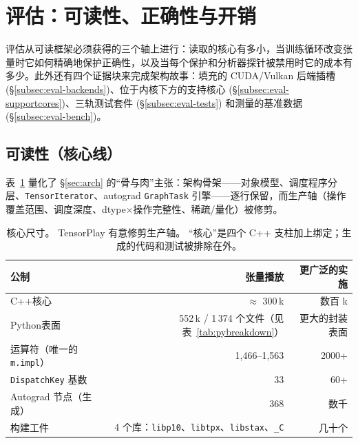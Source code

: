 \section{评估：可读性、正确性与开销}
\label{sec:eval}

评估从可读框架必须获得的三个轴上进行：读取的核心有多小，当训练循环改变张量时它如何精确地保护正确性，以及当每个保护和分析器探针被禁用时它的成本有多少。此外还有四个证据块来完成架构故事：填充的 CUDA/Vulkan 后端插槽 (\S\ref{subsec:eval-backends})、位于内核下方的支持核心 (\S\ref{subsec:eval-supportcores})、三轨测试套件 (\S\ref{subsec:eval-tests}) 和测量的基准数据 (\S\ref{subsec:eval-bench})。

\subsection{可读性（核心线）}
\label{subsec:eval-readability}

表~\ref{tab:evalsize} 量化了 \S\ref{sec:arch} 的“骨与肉”主张：架构骨架——对象模型、调度程序分层、\texttt{TensorIterator}、autograd \texttt{GraphTask} 引擎——逐行保留，而生产轴（操作覆盖范围、调度深度、dtype$\times$操作完整性、稀疏/量化）被修剪。

\begin{table}[H]
\centering
\caption{核心尺寸。 TensorPlay 有意修剪生产轴。 “核心”是四个 C++ 支柱加上绑定；生成的代码和测试被排除在外。}
\label{tab:evalsize}
\small
\begin{tabular}{lrr}
\toprule
公制 & 张量播放 & 更广泛的实施 \\
\midrule
C++核心 & $\approx$ 300\,k & 数百 k \\
Python表面 & 552\,k / 1\,374 个文件（见表~\ref{tab:pybreakdown}） & 更大的封装表面 \\
运算符（唯一的 \texttt{m.impl}） & 1{,}466--1{,}563 & 2000+ \\
\texttt{DispatchKey} 基数 & 33 & 60+ \\
Autograd 节点（生成） & 368 & 数千 \\
构建工件 & 4 个库：\texttt{libp10}、\texttt{libtpx}、\texttt{libstax}、\texttt{\_C} & 几十个 \\
\bottomrule
\end{tabular}
\end{table}

